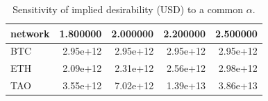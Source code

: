 \begin{table}
\caption{Sensitivity of implied desirability (USD) to a common $\alpha$.}
\label{tab:alpha}
\begin{tabular}{lrrrr}
\toprule
network & 1.800000 & 2.000000 & 2.200000 & 2.500000 \\
\midrule
BTC & 2.95e+12 & 2.95e+12 & 2.95e+12 & 2.95e+12 \\
ETH & 2.09e+12 & 2.31e+12 & 2.56e+12 & 2.98e+12 \\
TAO & 3.55e+12 & 7.02e+12 & 1.39e+13 & 3.86e+13 \\
\bottomrule
\end{tabular}
\end{table}
